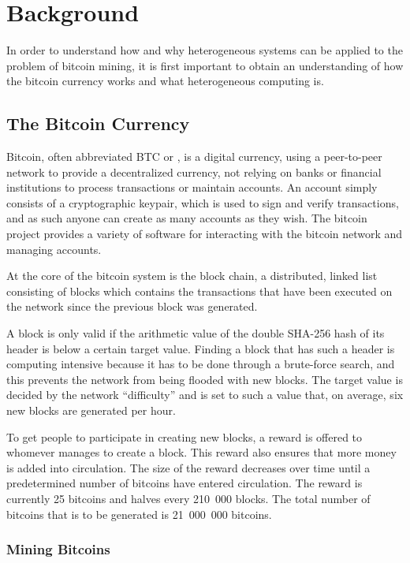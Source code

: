 \chapter{Background}
\label{cha:background}

In order to understand how and why heterogeneous systems can be applied to the problem of
bitcoin mining, it is first important to obtain an understanding of how the bitcoin currency
works and what heterogeneous computing is.

\section{The Bitcoin Currency}
\label{sec:bitcoins}
Bitcoin, often abbreviated BTC or \bitcoin, is a digital currency, using a peer-to-peer network to provide
a decentralized currency, not relying on banks or financial institutions to process transactions
or maintain accounts. An account simply consists of a cryptographic keypair, which is used to sign
and verify transactions, and as such anyone can create as many accounts as they wish. The bitcoin
project provides a variety of software for interacting with the bitcoin network and managing
accounts.

At the core of the bitcoin system is the block chain, a distributed, linked list consisting of blocks
which contains the transactions that have been executed on the network since the previous block was
generated.

A block is only valid if the arithmetic value of the double SHA-256 hash of its header is below
a certain target value. Finding a block that has such a header is computing intensive because it
has to be done through a brute-force search, and this prevents the network from being flooded with
new blocks. The target value is decided by the network ``difficulty'' and is set to such a value
that, on average, six new blocks are generated per hour.

To get people to participate in creating new blocks, a reward is offered to whomever manages to
create a block. This reward also ensures that more money is added into circulation. The size of
the reward decreases over time until a predetermined number of bitcoins have entered circulation.
The reward is currently 25 bitcoins and halves every 210~000 blocks. The total number of bitcoins
that is to be generated is 21~000~000 bitcoins. \cite{bitcoin}

\subsection{Mining Bitcoins}
\label{sec:bitcoin-mining}

